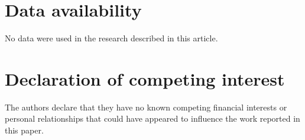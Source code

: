 \documentclass[preprint,12pt,a4paper]{elsarticle}
\begin{document}
\section*{Data availability}
No data were used in the research described in this article.

\section*{Declaration of competing interest}
The authors declare that they have no known competing financial interests or personal relationships that could have appeared to influence the work reported in this paper.

\appendix
\setcounter{table}{0}
\renewcommand{\thetable}{\Alph{section}.\arabic{table}}
\renewcommand{\theHtable}{appendix.\Alph{section}.\arabic{table}}
\renewcommand{\thetheorem}{\Alph{section}.\arabic{theorem}}
\clearpage
{}
\clearpage
\thispagestyle{plain}
\end{document}
